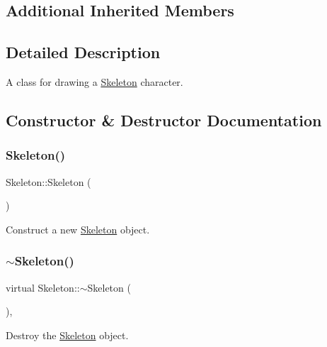 \subsection*{Additional Inherited Members}


\subsection{Detailed Description}
A class for drawing a \mbox{\hyperlink{classSkeleton}{Skeleton}} character. 



\subsection{Constructor \& Destructor Documentation}
\mbox{\label{classSkeleton_af01a02f1ce9ae4c801cd6e66ccf7407f}} 
\subsubsection{\texorpdfstring{Skeleton()}{Skeleton()}}
{\footnotesize\ttfamily Skeleton\+::\+Skeleton (\begin{DoxyParamCaption}{ }\end{DoxyParamCaption})}



Construct a new \mbox{\hyperlink{classSkeleton}{Skeleton}} object. 

\mbox{\label{classSkeleton_ae6a32fa46fd502bc2f6c2cfafff24003}} 
\subsubsection{\texorpdfstring{$\sim$Skeleton()}{~Skeleton()}}
{\footnotesize\ttfamily virtual Skeleton\+::$\sim$\+Skeleton (\begin{DoxyParamCaption}{ }\end{DoxyParamCaption})\hspace{0.3cm}{\ttfamily [virtual]}, {\ttfamily [default]}}



Destroy the \mbox{\hyperlink{classSkeleton}{Skeleton}} object. 



